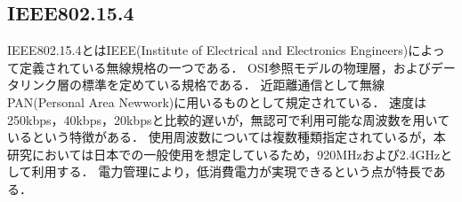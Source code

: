 \subsection*{IEEE802.15.4}

IEEE802.15.4とはIEEE(Institute of Electrical and Electronics Engineers)によって定義されている無線規格の一つである．
OSI参照モデルの物理層，およびデータリンク層の標準を定めている規格である．
近距離通信として無線PAN(Personal Area Newwork)に用いるものとして規定されている\cite{wnet}．
速度は250kbps，40kbps，20kbps\cite{ieee}と比較的遅いが，無認可で利用可能な周波数を用いているという特徴がある．
使用周波数については複数種類指定されているが，本研究においては日本での一般使用を想定しているため，920MHzおよび2.4GHzとして利用する．
電力管理により，低消費電力が実現できるという点が特長である．